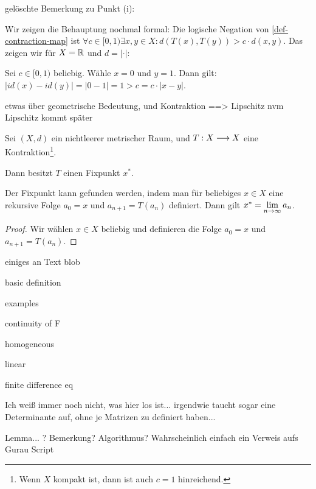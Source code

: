 \begin{query}
    gelöschte Bemerkung zu Punkt (i):

    Wir zeigen die Behauptung nochmal formal: Die logische Negation von \ref{def-contraction-map} ist $\forall c \in [0, 1) \exists x, y \in X: d(T(x), T(y)) > c \cdot d(x, y)$. Das zeigen wir für $X = \mathbb{R}$ und $d = |\cdot|$:
        
    Sei $c \in [0, 1)$ beliebig. Wähle $x = 0$ und $y = 1$. Dann gilt: $|id(x) - id(y)| = |0 - 1| = 1 > c = c \cdot |x - y|$.
\end{query}

etwas über geometrische Bedeutung, und Kontraktion ==> Lipschitz nvm Lipschitz kommt später

\begin{theorem}
    Sei $(X, d)$ ein nichtleerer metrischer Raum, und $T: X \longrightarrow X$ eine Kontraktion\footnote{Wenn $X$ kompakt ist, dann ist auch $c=1$ hinreichend.}.

    Dann besitzt $T$ einen Fixpunkt $x^*$.

    Der Fixpunkt kann gefunden werden, indem man für beliebiges $x \in X$ eine rekursive Folge $a_0 = x$ und $a_{n+1} = T(a_n)$ definiert. Dann gilt $x^* = \lim\limits_{n \rightarrow \infty} a_n$.
\end{theorem}
\begin{proof}
    Wir wählen $x \in X$ beliebig und definieren die Folge $a_0 = x$ und $a_{n+1} = T(a_n)$.
\end{proof}

\begin{definition}
    einiges an Text blob

    basic definition
    
    examples

    continuity of F

    homogeneous

    linear

    finite difference eq

    Ich weiß immer noch nicht, was hier los ist... irgendwie taucht sogar eine Determinante auf, ohne je Matrizen zu definiert haben...
\end{definition}

\begin{lemma}
    Lemma... ? Bemerkung? Algorithmus? Wahrscheinlich einfach ein Verweis aufs Gurau Script
\end{lemma}

